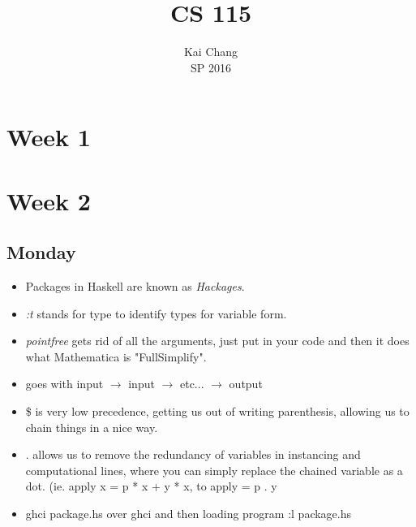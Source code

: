 \documentclass[12pt]{article}
\numberwithin{equation}{subsection}
\begin{document}
 
 
\title{CS 115}%
\author{Kai Chang\\ %
SP 2016} %
 
\maketitle


\section{Week 1}

\section{Week 2}
\subsection{Monday}
\begin{itemize}
\item Packages in Haskell are known as \textit{Hackages}.
\item \textit{:t} stands for type to identify types for variable form.
\item \textit{pointfree} gets rid of all the arguments, just put in your code and then it does what Mathematica is "FullSimplify".
\item goes with input $\rightarrow$ input $\rightarrow$ etc... $\rightarrow$ output
\item \$ is very low precedence, getting us out of writing parenthesis, allowing us to chain things in a nice way.
\item . allows us to remove the redundancy of variables in instancing and computational lines, where you can simply replace the chained variable as a dot. (ie. apply x = p * x + y * x, to apply =  p . y
\item ghci package.hs over ghci and then loading program :l package.hs
\end{itemize}
\end{document}

